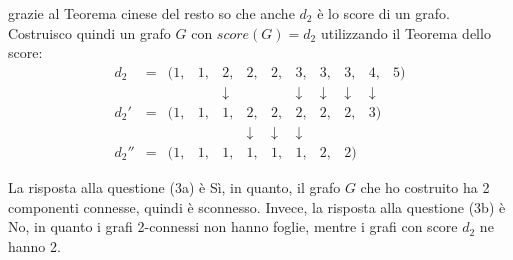 \documentclass[12pt, a4paper]{report}
\theoremstyle{definition}
\begin{document}
grazie al Teorema cinese del resto so che anche $d_2$ è lo score di un grafo.
Costruisco quindi un grafo $G$ con $score(G)=d_2$ utilizzando il Teorema dello
score:
\[\begin{array}{rccccccccccl}
    d_2  &= &(1, &1, &2, &2, &2, &3, &3, &3, &4, &5)\\
         &  &    &   &\downarrow& &  &\downarrow &\downarrow &\downarrow &\downarrow&\\
    d_2' &= &(1, &1, &1, &2, &2, &2, &2, &2, &3)\\
         &  &    &   &   &\downarrow &\downarrow &\downarrow\\
    d_2''&= &(1, &1, &1, &1, &1, &1, &2, &2)
\end{array}\]
\begin{center}
\hspace{-4cm}
\end{center}
La risposta alla questione (3a) è Sì, in quanto, il grafo $G$ che ho costruito ha
2 componenti connesse, quindi è sconnesso. Invece, la risposta alla questione
(3b) è No, in quanto i grafi 2-connessi non hanno foglie, mentre i grafi con
score $d_2$ ne hanno 2.

\newpage
\end{document}
